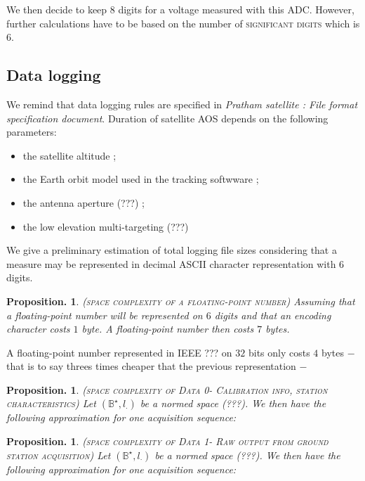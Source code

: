 \documentclass[twocolumn,pre,floats,aps,amsmath,amssymb]{revtex4}
\newtheorem{proposition}[theorem]{Proposition.}
\newenvironment{remark}[1][Remarque.]{\begin{trivlist}
\item[\hskip \labelsep {\bfseries #1}]}{\end{trivlist}}
\begin{document}
We then decide to keep $8$ digits for a voltage measured with this ADC. However, further calculations have to be based on the number of \textsc{significant digits} which is $6$. 

\subsection{Data logging}

We remind that data logging rules are specified in \textit{Pratham satellite : File format specification document}\cite{IITB_filespec}. Duration of satellite AOS depends on the following parameters:

\begin{itemize}
\item{the satellite altitude ;}
\item{the Earth orbit model used in the tracking softwware ;}
\item{the antenna aperture (???) ;}
\item{the low elevation multi-targeting (???)}
\end{itemize}

We give a preliminary estimation of total logging file sizes considering that a measure may be represented in decimal ASCII character representation with 6 digits.

\begin{proposition}
  (\textsc{space complexity of a floating-point number})
  Assuming that a floating-point number will be represented on $6$ digits and that an encoding character costs $1$ byte. A floating-point number then costs $7$ bytes.
\end{proposition}

\begin{remark}
  A floating-point number represented in IEEE ??? on $32$ bits only costs $4$ bytes $-$ that is to say threes times cheaper that the previous representation $-$
\end{remark}

\begin{proposition}
  (\textsc{space complexity of Data 0- Calibration info, station characteristics})
  Let $(\mathbb{B}^{\star}, l_{\cdot})$ be a normed space (???). We then have the following approximation for one acquisition sequence:
\end{proposition}

\begin{proposition}
  (\textsc{space complexity of Data 1- Raw output from ground station acquisition})
  Let $(\mathbb{B}^{\star}, l_{\cdot})$ be a normed space (???). We then have the following approximation for one acquisition sequence:
\end{proposition}
\end{document}
